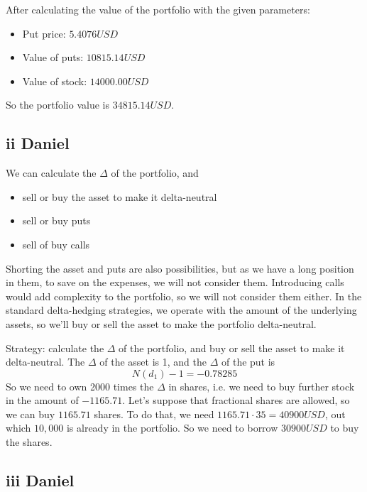 \documentclass{article}
\begin{document}
After calculating the value of the portfolio with the given parameters:
\begin{itemize}
    \item Put price: $5.4076USD$
    \item Value of puts: $10815.14USD$
    \item Value of stock: $14000.00USD$
\end{itemize}

So the portfolio value is $34815.14USD$.

\subsection{ii Daniel}
We can calculate the $\Delta$ of the portfolio, and
\begin{itemize}
    \item sell or buy the asset to make it delta-neutral
    \item sell or buy puts
    \item sell of buy calls
\end{itemize}
Shorting the asset and puts are also possibilities, but as we have a long position in them, to save on the expenses,
we will not consider them. Introducing calls would add complexity to the portfolio,
so we will not consider them either. In the standard delta-hedging strategies,
we operate with the amount of the underlying assets, so we'll buy or sell the asset to make the portfolio delta-neutral.

Strategy: calculate the $\Delta$ of the portfolio, and buy or sell the asset to make it delta-neutral.
The $\Delta$ of the asset is 1, and the $\Delta$ of the put is $$N(d_1)-1 = -0.78285$$
So we need to own 2000 times the $\Delta$ in shares, i.e. we need to buy further stock in the amount of $-1165.71$.
Let's suppose that fractional shares are allowed, so we can buy $1165.71$ shares.
To do that, we need $1165.71 \cdot 35 = 40900USD$, out which $10,000$ is already in the portfolio.
So we need to borrow $30900USD$ to buy the shares.
\subsection{iii Daniel}
\end{document}

